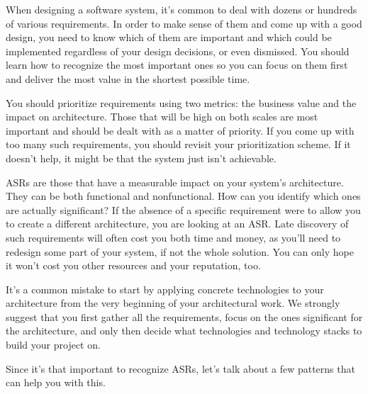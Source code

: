 
When designing a software system, it's common to deal with dozens or hundreds of various requirements. In order to make sense of them and come up with a good design, you need to know which of them are important and which could be implemented regardless of your design decisions, or even dismissed. You should learn how to recognize the most important ones so you can focus on them first and deliver the most value in the shortest possible time.

\begin{tcolorbox}[colback=webgreen!5!white,colframe=webgreen!75!black, title=TIP]
\hspace*{0.7cm}You should prioritize requirements using two metrics: the business value and the impact on architecture. Those that will be high on both scales are most important and should be dealt with as a matter of priority. If you come up with too many such requirements, you should revisit your prioritization scheme. If it doesn't help, it might be that the system just isn't achievable.

\end{tcolorbox}

ASRs are those that have a measurable impact on your system's architecture. They can be both functional and nonfunctional. How can you identify which ones are actually significant? If the absence of a specific requirement were to allow you to create a different architecture, you are looking at an ASR. Late discovery of such requirements will often cost you both time and money, as you'll need to redesign some part of your system, if not the whole solution. You can only hope it won't cost you other resources and your reputation, too.


\begin{tcolorbox}[colback=webgreen!5!white,colframe=webgreen!75!black, title=TIP]
\hspace*{0.7cm}It's a common mistake to start by applying concrete technologies to your architecture from the very beginning of your architectural work. We strongly suggest that you first gather all the requirements, focus on the ones significant for the architecture, and only then decide what technologies and technology stacks to build your project on.

\end{tcolorbox}

Since it's that important to recognize ASRs, let's talk about a few patterns that can help you with this.


